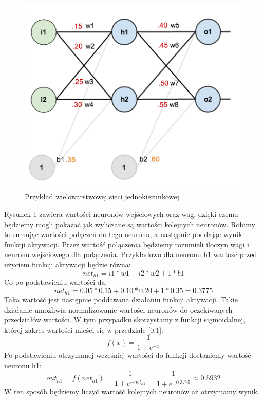 \begin{figure}[!ht]
    \includegraphics[width=\linewidth]{images/feed-forward-diagram.png}
    \caption{Przykład wielowarstwowej sieci jednokierunkowej}
\end{figure}

Rysunek 1 zawiera wartości neuronów wejściowych oraz wag, dzięki czemu będziemy mogli pokazać jak wyliczane są wartości kolejnych neuronów.
Robimy to sumując wartości połączeń do tego neuronu, a następnie poddając wynik funkcji aktywacji.
Przez wartość połączenia będziemy rozumieli iloczyn wagi i neuronu wejściowego dla połączenia.
Przykładowo dla neuronu h1 wartość przed użyciem funkcji aktywacji będzie równa:
\[
  net_{h1}  = i1*w1+i2*w2+1*b1
\]
Co po podstawieniu wartości da:
\[
  net_{h1} = 0.05*0.15+0.10*0.20+1*0.35=0.3775
\]
Taka wartość jest następnie poddawana działaniu funkcji aktywacji. 
Takie działanie umożliwia normalizowanie wartości neuronów do oczekiwanych przedziałów wartości.
W tym przypadku skorzystamy z funkcji sigmoidalnej, której zakres wartości mieści się w przedziale [0,1]:
\[
    f(x) =  \frac{\mathrm{1} }{\mathrm{1} + e^{-x} } 
\]
Po podstawieniu otrzymanej wcześniej wartości do funkcji dostaniemy wartość neuronu h1:
\[
    out_{h1} 
    = f(net_{h1}) 
    =  \frac{\mathrm{1} }{\mathrm{1} + e^{-net_{h1}} } 
    =  \frac{\mathrm{1} }{\mathrm{1} + e^{-0.3775} } \approx 0.5932
\]
W ten sposób będziemy liczyć wartość kolejnych neuronów aż otrzymamy wynik.

